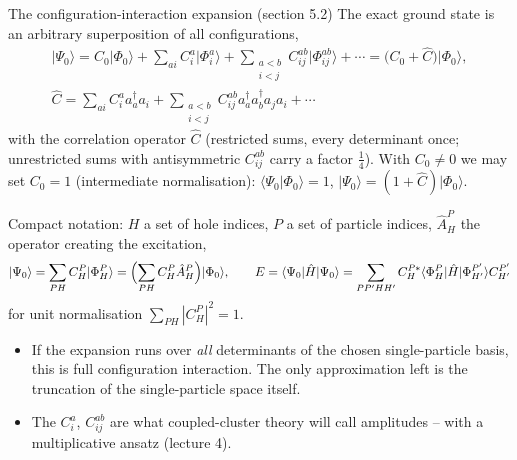 \documentclass[aspectratio=169,10pt]{beamer}
\newcommand{\ket}[1]{\vert #1\rangle}
\newcommand{\bra}[1]{\langle #1\vert}
\newcommand{\braket}[2]{\langle #1\vert #2\rangle}
\begin{document}
\begin{frame}{The configuration-interaction expansion (section 5.2)}
  \footnotesize
  The exact ground state is an arbitrary superposition of all configurations,
  \begin{gather*}
    \ket{\Psi_0}=C_0\ket{\Phi_0}+\sum_{ai}C_i^a\ket{\Phi_i^a}+\sum_{\substack{a<b\\i<j}}C_{ij}^{ab}\ket{\Phi_{ij}^{ab}}+\cdots
    =\bigl(C_0+\hat{C}\bigr)\ket{\Phi_0},\\
    \hat{C}=\sum_{ai}C_i^aa_a^{\dagger}a_i+\sum_{\substack{a<b\\i<j}}C_{ij}^{ab}a_a^{\dagger}a_b^{\dagger}a_ja_i+\cdots
  \end{gather*}
  with the \alert{correlation operator} $\hat{C}$ (restricted sums, every determinant once; unrestricted sums with antisymmetric $C_{ij}^{ab}$ carry a factor $\frac14$). With $C_0\neq0$ we may set $C_0=1$ (\alert{intermediate normalisation}): $\braket{\Psi_0}{\Phi_0}=1$, $\ket{\Psi_0}=(1+\hat{C})\ket{\Phi_0}$.
  \vspace{0.3em}

  Compact notation: $H$ a set of hole indices, $P$ a set of particle indices, $\hat{A}_H^P$ the operator creating the excitation,
  \[
    \ket{\Psi_0}=\sum_{PH}C_H^P\ket{\Phi_H^P}=\Bigl(\sum_{PH}C_H^P\hat{A}_H^P\Bigr)\ket{\Phi_0},
    \qquad
    E=\bra{\Psi_0}\hat{H}\ket{\Psi_0}=\sum_{PP'HH'}C_H^{P*}\bra{\Phi_H^P}\hat{H}\ket{\Phi_{H'}^{P'}}C_{H'}^{P'}
  \]
  for unit normalisation $\sum_{PH}|C_H^P|^2=1$.
  \begin{itemize}
    \item If the expansion runs over \emph{all} determinants of the chosen single-particle basis, this is \alert{full configuration interaction}. The only approximation left is the truncation of the single-particle space itself.
    \item The $C_i^a$, $C_{ij}^{ab}$ are what coupled-cluster theory will call amplitudes -- with a multiplicative ansatz (lecture 4).
  \end{itemize}
\end{frame}
\end{document}
